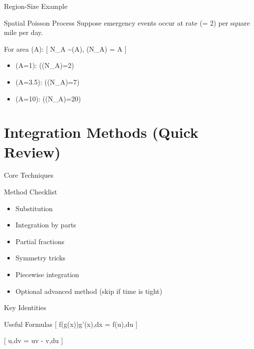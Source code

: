 \documentclass[
  ignorenonframetext,
]{beamer}
\providecommand{\tightlist}{%
  \setlength{\itemsep}{0pt}\setlength{\parskip}{0pt}}
\begin{document}
\begin{frame}{Region-Size Example}
\label{region-size-example}
\begin{block}{Spatial Poisson Process}
\label{spatial-poisson-process}
Suppose emergency events occur at rate (\rho = 2) per square mile per
day.

For area (A): {[} N\_A \sim \Pois(\rho A), \quad \Ex(N\_A) = \rho A {]}

\begin{itemize}
\tightlist
\item
  (A=1): (\Ex(N\_A)=2)
\item
  (A=3.5): (\Ex(N\_A)=7)
\item
  (A=10): (\Ex(N\_A)=20)
\end{itemize}
\end{block}
\end{frame}

\section{Integration Methods (Quick
Review)}\label{integration-methods-quick-review}

\begin{frame}{Core Techniques}
\label{core-techniques}
\begin{block}{Method Checklist}
\label{method-checklist}
\begin{itemize}
\tightlist
\item
  Substitution
\item
  Integration by parts
\item
  Partial fractions
\item
  Symmetry tricks
\item
  Piecewise integration
\item
  Optional advanced method (skip if time is tight)
\end{itemize}
\end{block}
\end{frame}

\begin{frame}{Key Identities}
\label{key-identities}
\begin{block}{Useful Formulas}
\label{useful-formulas}
{[} \int f(g(x))g'(x),dx = \int f(u),du {]}

{[} \int u,dv = uv - \int v,du {]}
\end{block}
\end{frame}
\end{document}

